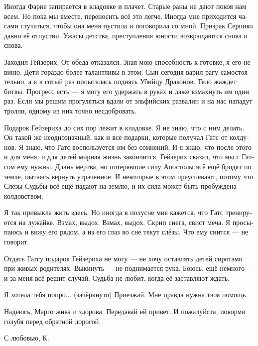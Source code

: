 \documentclass[a4paper,12pt,fleqn]{book}\usepackage{polyglossia}\setdefaultlanguage[babelshorthands=true]{russian}\setotherlanguage{english}\defaultfontfeatures{Ligatures=TeX,Mapping=tex-text}\usepackage{xcolor}\newcommand{\ml}[3]{#2}
\begin{document}
Иногда Фарне запирается в кладовке и плачет.
Старые раны не дают покоя нам всем.
Но пока мы вместе, переносить всё это легче.
Иногда мне приходится часами стучаться, чтобы она меня пустила и поговорила со мной.
Призрак Серпико давно её отпустил.
Ужасы детства, преступления юности возвращаются снова и снова.

Заходил Гейзерих.
От обеда отказался.
Зная мою способность к готовке, я его не виню.
Дети гораздо более талантливы в этом.
Сын сегодня варил рагу самостоятельно, а я в сотый раз попыталась поднять Убийцу Драконов.
Тело жаждет битвы.
Прогресс есть --- я могу его удержать в руках и даже взмахнуть им один раз.
Если мы решим прогуляться вдали от эльфийских развалин и на нас нападут тролли, одному из них точно несдобровать.

Подарок Гейзериха до сих пор лежит в кладовке.
Я не знаю, что с ним делать.
Он такой же неоднозначный, как и все подарки, которые получал Гатс от колдунов.
Я знаю, что Гатс воспользуется им без сомнений.
И я знаю, что после этого и для меня, и для детей мирная жизнь закончится.
Гейзерих сказал, что мы с Гатсом ему нужны.
Длань мертва, но потерявшие силу Апостолы всё ещё бродят по земле, пытаясь вернуть утраченное.
И некоторые в этом преуспевают, потому что Слёзы Судьбы всё ещё падают на землю, и их сила может быть пробуждена колдовством.

Я так привыкла жить здесь.
Но иногда в полусне мне кажется, что Гатс тренируется на лужайке.
Взмах, выдох. 
Взмах, выдох.
Скрип снега, свист меча.
Я просыпаюсь и вижу его рядом, а из его глаз во сне текут слёзы.
Что ему снится --- не говорит.

Отдать Гатсу подарок Гейзериха не могу --- не хочу оставлять детей сиротами при живых родителях.
Выкинуть --- не поднимается рука.
Боюсь, ещё немного --- и за меня всё решит случай.
Судьба не любит, когда её заставляют ждать.

Я хотела тебя попро... (зачёркнуто)
Приезжай.
Мне правда нужна твоя помощь.

Надеюсь, Марго жива и здорова.
Передавай ей привет.
И пожалуйста, покорми голубя перед обратной дорогой.

С любовью, К.
\end{document}
